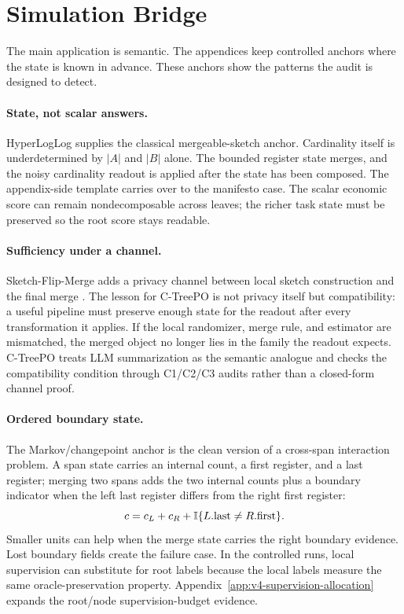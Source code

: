 \section{Simulation Bridge}\label{sec:min-validation}

The main application is semantic. The appendices keep controlled anchors where
the state is known in advance. These anchors show the patterns the audit is
designed to detect.

\paragraph{State, not scalar answers.}
HyperLogLog supplies the classical mergeable-sketch anchor. Cardinality itself
is underdetermined by $|A|$ and $|B|$ alone. The bounded register state
merges, and the noisy cardinality readout is applied after the state has been
composed. The appendix-side template carries over to the manifesto case. The
scalar economic score can remain nondecomposable across leaves; the richer
task state must be preserved so the root score stays readable.

\paragraph{Sufficiency under a channel.}
Sketch-Flip-Merge adds a privacy channel between local sketch construction and
the final merge \citep{HehirTingCormode2023SFM}. The lesson for C-TreePO is
not privacy itself but compatibility: a useful pipeline must preserve enough
state for the readout after every transformation it applies. If the local
randomizer, merge rule, and estimator are mismatched, the merged object no
longer lies in the family the readout expects. C-TreePO treats LLM
summarization as the semantic analogue and checks the compatibility condition
through C1/C2/C3 audits rather than a closed-form channel proof.

\paragraph{Ordered boundary state.}
The Markov/changepoint anchor is the clean version of a cross-span interaction
problem. A span state carries an internal count, a first register, and a last
register; merging two spans adds the two internal counts plus a boundary
indicator when the left last register differs from the right first register:
\[
  c=c_L+c_R+\mathbb{I}\{L.\mathrm{last}\ne R.\mathrm{first}\}.
\]
Smaller units can help when the merge state carries the right boundary
evidence. Lost boundary fields create the failure case. In the controlled
runs, local supervision can substitute for root labels because the local
labels measure the same oracle-preservation property. Appendix~\ref{app:v4-supervision-allocation}
expands the root/node supervision-budget evidence.


